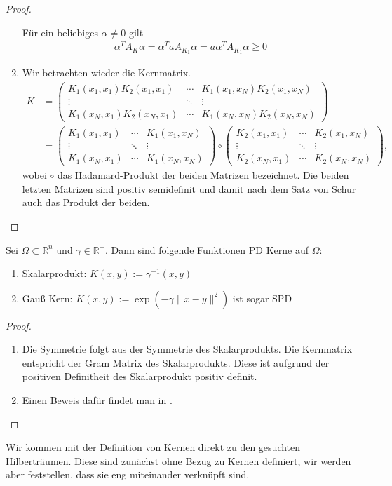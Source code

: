 \begin{proof}
\begin{enumerate}
Für ein beliebiges $\alpha \neq 0$ gilt
\begin{align*}
\alpha^T A_K \alpha = \alpha^T a A_{K_1} \alpha = a \alpha^T A_{K_1} \alpha \geq 0
\end{align*}
\item
Wir betrachten wieder die Kernmatrix.
\begin{align*}
K &= 
\begin{pmatrix}
K_1(x_1,x_1)K_2(x_1, x_1) & \cdots & K_1(x_1,x_N)K_2(x_1, x_N) \\ 
\vdots & \ddots & \vdots \\ 
K_1(x_N,x_1)K_2(x_N, x_1) & \cdots & K_1(x_N,x_N)K_2(x_N, x_N)
\end{pmatrix} \\
&= 
\begin{pmatrix}
K_1(x_1,x_1) & \cdots & K_1(x_1,x_N) \\ 
\vdots & \ddots & \vdots \\ 
K_1(x_N,x_1) & \cdots & K_1(x_N,x_N)
\end{pmatrix}
\circ
\begin{pmatrix}
K_2(x_1, x_1) & \cdots & K_2(x_1, x_N) \\ 
\vdots & \ddots & \vdots \\ 
K_2(x_N, x_1) & \cdots & K_2(x_N, x_N)
\end{pmatrix},
\end{align*}
wobei $\circ$ das Hadamard-Produkt der beiden Matrizen bezeichnet. 
Die beiden letzten Matrizen sind positiv semidefinit und damit nach dem Satz von Schur \cite{.30.07.2018} auch das Produkt der beiden.
\end{enumerate}
\end{proof}

\begin{example}
\label{ex:Kern}
Sei $\Omega \subset \mathbb{R}^n$ und $\gamma \in \mathbb{R}^+$. Dann sind folgende Funktionen \ac{PD} Kerne auf $\Omega$:
\begin{enumerate}
\item Skalarprodukt: $K(x,y) := \gamma^{-1} (x,y)$
\item Gauß Kern: $K(x,y) := \exp\left(-\gamma \|x-y\|^2\right)$ ist sogar \ac{SPD}
\end{enumerate}
\end{example}

\begin{proof}
$\mbox{}$
\begin{enumerate}
\item
Die Symmetrie folgt aus der Symmetrie des Skalarprodukts. Die Kernmatrix entspricht der Gram Matrix des Skalarprodukts. Diese ist aufgrund der positiven Definitheit des Skalarprodukt positiv definit. 
\item
Einen Beweis dafür findet man in \textcite[Theorem 6.10]{Wendland.2005}.
\end{enumerate}
\end{proof}
Wir kommen mit der Definition von Kernen direkt zu den gesuchten Hilberträumen. Diese sind zunächst ohne Bezug zu Kernen definiert, wir werden aber feststellen, dass sie eng miteinander verknüpft sind.

